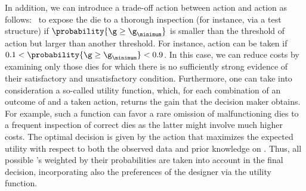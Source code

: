 In addition, we can introduce a trade-off action between action \one and action
\two as follows: \three~to expose the die to a thorough inspection (for
instance, via a test structure) if $\probability{\g \geq \g_\minimum}$ is
smaller than the threshold of action \one but larger than another threshold. For
instance, action \three can be taken if $0.1 < \probability{\g \geq \g_\minimum}
< 0.9$. In this case, we can reduce costs by examining only those dies for which
there is no sufficiently strong evidence of their satisfactory and
unsatisfactory condition. Furthermore, one can take into consideration a
so-called utility function, which, for each combination of an outcome of \g and
a taken action, returns the gain that the decision maker obtains. For example,
such a function can favor a rare omission of malfunctioning dies to a frequent
inspection of correct dies as the latter might involve much higher costs. The
optimal decision is given by the action that maximizes the expected utility with
respect to both the observed data and prior knowledge on \g. Thus, all possible
\g's weighted by their probabilities are taken into account in the final
decision, incorporating also the preferences of the designer via the utility
function.

